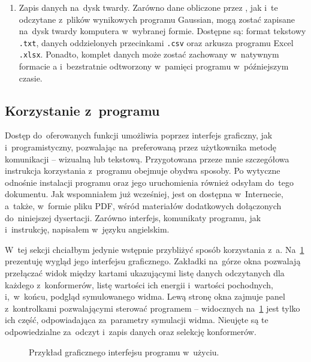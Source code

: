 \begin{enumerate}
  \item Zapis danych na~dysk twardy.
    Zarówno dane obliczone przez \tesliper{}, jak i~te odczytane z~plików wynikowych programu
      Gaussian, mogą zostać zapisane na~dysk twardy komputera w~wybranej formie.
    Dostępne są: format tekstowy \texttt{.txt}, danych oddzielonych przecinkami \texttt{.csv}
      oraz arkusza programu Excel \texttt{.xlsx}.
    Ponadto, komplet danych może zostać zachowany w~natywnym formacie \tesliper{}a
      i~bezstratnie odtworzony w~pamięci programu w~późniejszym czasie.
  
\end{enumerate}

\subsection{Korzystanie z~programu}\label{essence:use}
Dostęp do~oferowanych funkcji \tesliper{} umożliwia poprzez interfejs graficzny, jak
  i~programistyczny, pozwalając na~preferowaną przez użytkownika metodę komunikacji \---
  wizualną lub tekstową.
Przygotowana przeze mnie szczegółowa instrukcja korzystania z~programu obejmuje obydwa sposoby.
Po wytyczne odnośnie instalacji programu oraz jego uruchomienia również odsyłam do~tego
  dokumentu.
Jak wspomniałem już wcześniej, jest on dostępna w~Internecie,
  a~także, w~formie pliku PDF, wśród materiałów dodatkowych dołączonych do~niniejszej dysertacji.
Zarówno interfejs, komunikaty programu, jak i~instrukcję, napisałem w~języku angielskim.

W~tej sekcji chciałbym jedynie wstępnie przybliżyć sposób korzystania z~\tesliper{}a.
Na~\cref{fig:gui-demo} prezentuję wygląd jego interfejsu graficznego.
Zakładki na~górze okna pozwalają przełączać widok między kartami ukazującymi listę danych
  odczytanych dla każdego z~konformerów, listę wartości ich energii i~wartości pochodnych,
  i,~w~końcu, podgląd symulowanego widma.
Lewą stronę okna zajmuje panel z~kontrolkami pozwalającymi sterować programem \--- widocznych
  na~\cref{fig:gui-demo} jest tylko ich część, odpowiadająca za~parametry symulacji widma.
Nieujęte są te odpowiedzialne za~odczyt i~zapis danych oraz selekcję konformerów.

\begin{figure}
  \caption{Przykład graficznego interfejsu programu \tesliper{} w~użyciu.}
  \label{fig:gui-demo}
\end{figure}

